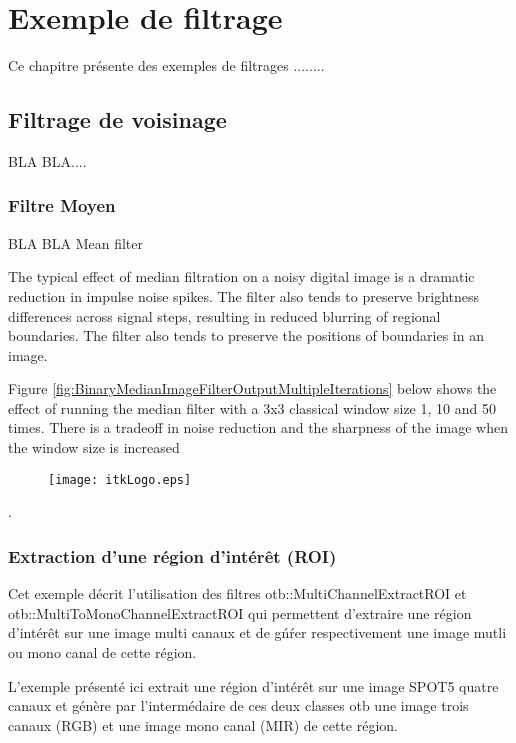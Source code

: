 \chapter{Exemple de filtrage}

Ce chapitre pr\'{e}sente des exemples de filtrages ........


\section{Filtrage de voisinage}
\label{sec:NeighborhoodFilters}

BLA BLA....


\subsection{Filtre Moyen}
\label{sec:MeanFilter}

\ifitkFullVersion

\fi

BLA BLA Mean filter


The typical effect of median filtration on a noisy digital image is a dramatic reduction in impulse noise spikes. The filter also tends to preserve brightness differences across signal steps, resulting in reduced blurring of regional boundaries. The filter also tends to preserve the positions of boundaries in an image.

Figure \ref{fig:BinaryMedianImageFilterOutputMultipleIterations} below shows the effect of running the median filter with a 3x3 classical window size 
1, 10 and 50 times. There is a tradeoff in noise reduction and the sharpness of the image when the window size is increased\begin{figure}
  \center
  \texttt{[image: itkLogo.eps]}
  \label{fig:itkLogo}
\end{figure}.

\subsection{Extraction d'une r\'egion d'int\'er\^et (ROI)}
\label{sec:ExtractROI}

Cet exemple d\'ecrit l'utilisation des filtres otb::MultiChannelExtractROI et
otb::MultiToMonoChannelExtractROI qui permettent d'extraire une r\'egion d'int\'er\^et
sur une image multi canaux et de g\'n\'rer respectivement une image mutli ou 
mono canal de cette r\'egion.

L'exemple pr\'esent\'e ici extrait une r\'egion d'int\'er\^et sur une image SPOT5 
quatre canaux et g\'en\`ere par l'interm\'edaire de ces deux classes otb une image trois 
canaux (RGB) et une image mono canal (MIR) de cette r\'egion. 


\ifitkFullVersion

\fi


